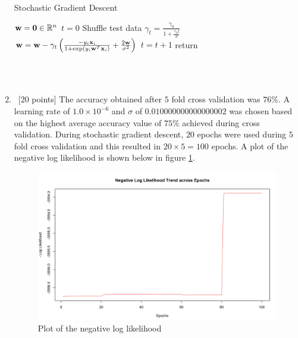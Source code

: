 \begin{enumerate}
\begin{minipage}{\linewidth}
  \begin{algorithm}[H]
    \caption{Stochastic Gradient Descent }\label{AlgSGD}
    \begin{algorithmic}[1]
        \State ${\bf w} = \textbf{0} \in \mathbb{R}^n$
        \State $t = 0$
	        \State Shuffle test data
			\State  $\gamma_t  = \frac{\gamma_0}{1+ \frac{\gamma_0 t}{\sigma}}$
			\State ${\bf w} = {\bf w} -  \gamma_t \left (\frac{-y_i {\bf x}_i}{1+ \exp(y_i{\bf w}^T{\bf x}_i)} + \frac{2{\bf w}}{\sigma^2} \right )$
			\State $ t = t+1$
          	\EndFor
	\EndFor
      \State return \bw
      \EndProcedure
    \end{algorithmic}
  \end{algorithm}
\end{minipage}\\\\

\item ~[20 points] The accuracy obtained after $5$ fold cross validation was $76\%$. A learning rate of $1.0 \times 10^{-6}$ and $\sigma$ of $0.010000000000000002$ was chosen based on the highest average accuracy value of $75\%$ achieved during cross validation. During stochastic gradient descent, $20$ epochs were used during $5$ fold cross validation and this resulted in $20 \times 5 = 100$ epochs. A plot of the negative log likelihood is shown below in figure \ref{logl}.

\begin{figure}[!t]
\centering
\includegraphics[width=5.5in]{NegativeLogLikelihood.png}
\caption{Plot of the negative log likelihood}
\label{logl}
\end{figure}

\end{enumerate}




